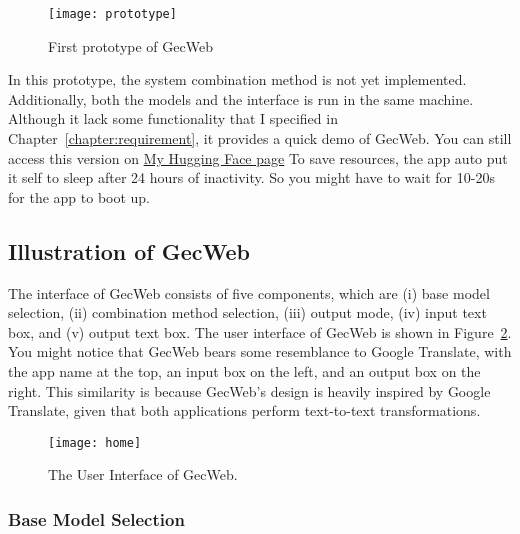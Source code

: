 \begin{figure}[htbp]
  \begin{center}
    \texttt{[image: prototype]}
  \end{center}
  \caption{First prototype of GecWeb}\label{fig:prototype}
\end{figure}

In this prototype, the system combination method is not yet implemented.
Additionally, both the models and the interface is run in the same machine.
Although it lack some functionality that I specified in Chapter~\ref{chapter:requirement}, it provides a quick demo of GecWeb.
You can still access this version on \href{https://huggingface.co/spaces/canh25xp/gector_demo}{My Hugging Face page}
To save resources, the app auto put it self to sleep after 24 hours of inactivity.
So you might have to wait for 10-20s for the app to boot up.

\subsection{Illustration of GecWeb}

The interface of GecWeb consists of five components, which are (i) base model selection, (ii) combination method selection, (iii) output mode, (iv) input text box, and (v) output text box.
The user interface of GecWeb is shown in Figure~\ref{fig:home}.
You might notice that GecWeb bears some resemblance to Google Translate, with the app name at the top, an input box on the left, and an output box on the right.
This similarity is because GecWeb's design is heavily inspired by Google Translate, given that both applications perform text-to-text transformations.

\begin{figure}[htbp]
  \begin{annotatedFigure}
    {\texttt{[image: home]}}
  \end{annotatedFigure}
  \caption{The User Interface of GecWeb.}\label{fig:home}
\end{figure}

\subsubsection{Base Model Selection}

